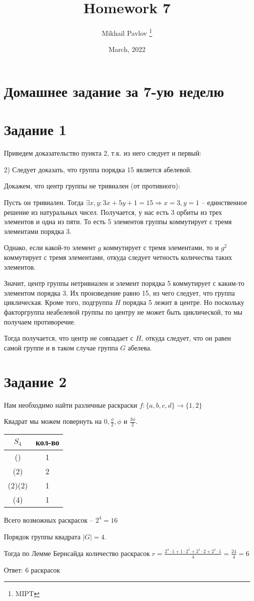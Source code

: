 \documentclass[12pt, a4paper]{article}
\title{Homework 7}
\author{Mikhail Pavlov \thanks{MIPT}}
\date{March, 2022}
\theoremstyle{definition}
\begin{document}
    \section{Домашнее задание за 7-ую неделю}

    \section*{Задание 1}

        Приведем доказательство пункта 2, т.к. из него следует и первый:

        2) Следует доказать, что группа порядка 15 является абелевой.

        Докажем, что центр группы не тривиален (от противного):

        Пусть он тривиален. Тогда $\exists x, y: 3x + 5y + 1 = 15 \Rightarrow x = 3, y = 1$ -- единственное решение из натуральных чисел.
        Получается, у нас есть 3 орбиты из трех элементов и одна из пяти. То есть 5 элементов группы коммутирует с тремя элементами порядка 3.

        Однако, если какой-то элемент $g$ коммутирует с тремя элементами, то и $g^2$ коммутирует с тремя элементами, откуда следует четность количества таких элементов.

        Значит, центр группы нетривиален и элемент порядка 5 коммутирует с каким-то элементом порядка 3. Их произведение равно 15, из чего следует, что группа циклическая.
        Кроме того, подгруппа $H$ порядка 5 лежит в центре. Но поскольку факторгруппа неабелевой группы по центру не может быть циклической, то мы получаем противоречие.

        Тогда получается, что центр не совпадает с $H$, откуда следует, что он равен самой группе и в таком случае группа $G$ абелева.

    \section*{Задание 2}

        Нам необходимо найти различные раскраски $f: \{a, b, c, d\} \rightarrow \{1, 2\}$

        Квадрат мы можем повернуть на $0, \frac{\phi}{2}, \phi$ и $\frac{3 \phi}{2}$.

    \begin{center}
        \begin{tabular}{ | c | c | }
            \hline
            $S_4$ & кол-во  \\ \hline
            () & 1  \\ \hline
            (2) & 2  \\ \hline
            (2)(2) & 1  \\ \hline
            (4) & 1  \\ \hline
        \end{tabular}
    \end{center}

    Всего возможных раскрасок -- $2^4 = 16$

    Порядок группы квадрата $|G| = 4$.

    Тогда по Лемме Бернсайда количество раскрасок $r = \frac{2^4 \cdot 1 + 1 \cdot 2^1 + 2^1 \cdot 2 + 2^1 \cdot 1}{4} = \frac{24}{4} = 6$

    Ответ: 6 раскрасок


    
\end{document}
